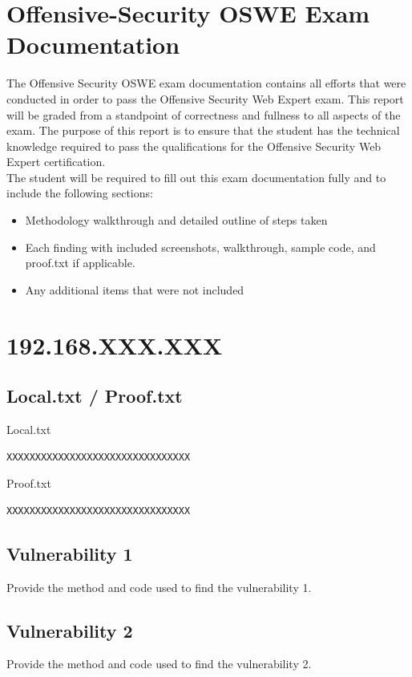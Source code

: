 \documentclass[a4paper]{article}
\begin{document}
\tableofcontents


\section{Offensive-Security OSWE Exam Documentation}

The Offensive Security OSWE exam documentation contains all efforts that were conducted in order to pass the Offensive Security Web Expert exam. This report will be graded from a standpoint of correctness and fullness to all aspects of the exam. The purpose of this report is to ensure that the student has the technical knowledge required to pass the qualifications for the Offensive Security Web Expert certification.
\\
The student will be required to fill out this exam documentation fully and to include the following sections:

\begin{itemize}
  \item Methodology walkthrough and detailed outline of steps taken
  \item Each finding with included screenshots, walkthrough, sample code, and proof.txt if applicable.
  \item Any additional items that were not included
\end{itemize}

\section{192.168.XXX.XXX}

\subsection{Local.txt / Proof.txt }
Local.txt
\begin{lstlisting}[language=Java]
XXXXXXXXXXXXXXXXXXXXXXXXXXXXXXXX
\end{lstlisting}

Proof.txt
\begin{lstlisting}[language=Java]
XXXXXXXXXXXXXXXXXXXXXXXXXXXXXXXX
\end{lstlisting}
\subsection{Vulnerability 1}
Provide the method and code used to find the vulnerability 1.

\subsection{Vulnerability 2}
Provide the method and code used to find the vulnerability 2.
\end{document}
